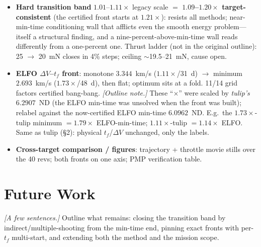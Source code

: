 \documentclass[11pt]{article}
\begin{document}
\begin{itemize}
        bounds, deliberately not first-order-certified --- keep that distinction
        explicit wherever these numbers appear. \emph{[Also: the ``$\times$
        min-time'' factors and the ``\% below min-time'' figure are stated
        against $6.2907$~ND; recompute them against the target-consistent tulip
        anchor ($\sim$5.8~ND, \S2) --- physical $t_f$ and $\Delta V$ values are
        unchanged, only the min-time-relative labels shift.]}
  \item \textbf{Hard transition band} $1.01$--$1.11\times$ legacy scale
        $=$ \textbf{$1.09$--$1.20\times$ target-consistent} (the certified front
        starts at $1.21\times$): resists all methods; near-min-time conditioning
        wall that afflicts even the smooth energy problem---itself a structural
        finding, and a nine-percent-above-min-time wall reads differently from
        a one-percent one. Thrust ladder (not in the original outline):
        25 $\to$ 20~mN closes in 4\% steps; ceiling $\sim$19.5--21~mN, cause
        open.
  \item \textbf{ELFO $\Delta V$--$t_f$ front}: monotone $3.344$~km/s
        ($1.11\times$/31~d) $\to$ minimum $2.693$~km/s ($1.73\times$/48~d), then
        flat; optimum sits at a fold. 11/14 grid factors certified bang-bang.
        \emph{[Outline note.]} These ``$\times$'' were scaled by \emph{tulip's}
        $6.2907$~ND (the ELFO min-time was unsolved when the front was built);
        relabel against the now-certified ELFO min-time $6.0962$~ND. E.g.\ the
        $1.73\times$-tulip minimum $=1.79\times$ ELFO-min-time; $1.11\times$-tulip
        $=1.14\times$ ELFO. Same as tulip (\S2): physical $t_f$/$\Delta V$
        unchanged, only the labels.
  \item \textbf{Cross-target comparison / figures}: trajectory + throttle movie
        stills over the 40 revs; both fronts on one axis; PMP verification table.
\end{itemize}

\section{Future Work}
\emph{[A few sentences.]} Outline what remains: closing the transition band by
indirect/multiple-shooting from the min-time end, pinning exact fronts with
per-$t_f$ multi-start, and extending both the method and the mission scope.
\end{document}
